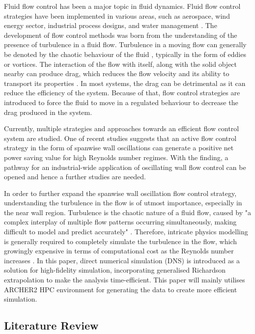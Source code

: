 Fluid flow control has been a major topic in fluid dynamics. Fluid flow control strategies have been implemented in various areas, such as aerospace, wind energy sector, industrial process designs, and water management \cite{Airiau2016}. The development of flow control methods was born from the understanding of the presence of turbulence in a fluid flow. Turbulence in a moving flow can generally be denoted by the chaotic behaviour of the fluid \cite{Benzi2023}, typically in the form of eddies or vortices. The interaction of the flow with itself, along with the solid object nearby can produce drag, which reduces the flow velocity and its ability to transport its properties \cite{Bell1979}. In most systems, the drag can be detrimental as it can reduce the efficiency of the system. Because of that, flow control strategies are introduced to force the fluid to move in a regulated behaviour to decrease the drag produced in the system. 

Currently, multiple strategies and approaches towards an efficient flow control system are studied. One of recent studies \cite{Marusic2021} suggests that an active flow control strategy in the form of spanwise wall oscillations can generate a positive net power saving value for high Reynolds number regimes. With the finding, a pathway for an industrial-wide application of oscillating wall flow control can be opened and hence a further studies are needed.

In order to further expand the spanwise wall oscillation flow control strategy, understanding the turbulence in the flow is of utmost importance, especially in the near wall region. Turbulence is the chaotic nature of a fluid flow, caused by "a complex interplay of multiple flow patterns occurring simultaneously, making difficult to model and predict accurately" \cite{Alberti2023}. Therefore, intricate physics modelling is generally required to completely simulate the turbulence in the flow, which growingly expensive in terms of computational cost as the Reynolds number increases \cite{Chen2021}. In this paper, direct numerical simulation (DNS) is introduced as a solution for high-fidelity simulation, incorporating generalised Richardson extrapolation to make the analysis time-efficient. This paper will mainly utilises ARCHER2 HPC environment for generating the data to create more efficient simulation.

\subsection{Literature  Review}

